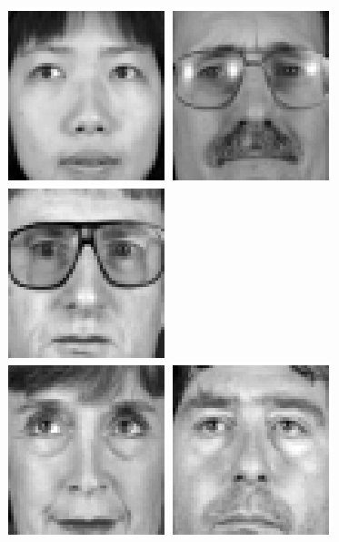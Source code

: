 \begin{figure}[ht]
\begin{center}
\includegraphics[scale=0.12]{ch4/figures/XM2VTS_46.png}
\includegraphics[scale=0.12]{ch4/figures/XM2VTS_47.png}
\includegraphics[scale=0.12]{ch4/figures/XM2VTS_48.png}\\
\includegraphics[scale=0.12]{ch4/figures/XM2VTS_49.png}
\includegraphics[scale=0.12]{ch4/figures/XM2VTS_50.png}

\end{center}
\end{figure}
